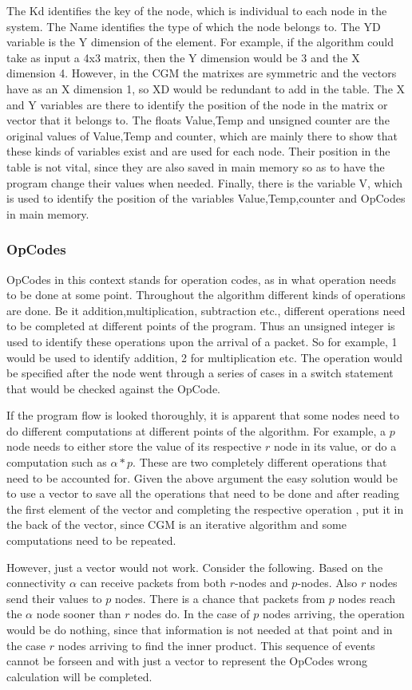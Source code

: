 \documentclass[12pt,a4paper]{article}
\begin{document}
The Kd identifies the key of the node, which is individual to each node in the system. The Name identifies the type of which the node belongs to. The YD variable is the Y dimension of the element. For example, if the algorithm could take as input a 4x3 matrix, then the Y dimension would be 3 and the X dimension 4. However, in the CGM the matrixes are symmetric and the vectors have as an X dimension 1, so XD would be redundant to add in the table. The X and Y variables are there to identify the position of the node in the matrix or vector that it belongs to. The floats Value,Temp and unsigned counter are the original values of Value,Temp and counter, which are mainly there to show that these kinds of variables exist and are used for each node. Their position in the table is not vital, since they are also saved in main memory so as to have the program change their values when needed. Finally, there is the variable V, which is used to identify the position of the variables Value,Temp,counter and OpCodes in main memory.
\subsubsection{OpCodes}
OpCodes in this context stands for operation codes, as in what operation needs to be done at some point. Throughout the algorithm different kinds of operations are done. Be it addition,multiplication, subtraction etc., different operations need to be completed at different points of the program. Thus an unsigned integer is used to identify these operations upon the arrival of a packet. So for example, 1 would be used to identify addition, 2 for multiplication etc. The operation would be specified after the node went through a series of cases in a switch statement that would be checked against the OpCode.

If the program flow is looked thoroughly, it is apparent that some nodes need to do different computations at different points of the algorithm. For example, a $p$ node needs to either store the value of its respective $r$ node in its value, or do a computation such as $\alpha *p$. These are two completely different operations that need to be accounted for. Given the above argument the easy solution would be to use a vector to save all the operations that need to be done and after reading the first element of the vector and completing the respective operation , put it in the back of the vector, since CGM is an iterative algorithm and some computations need to be repeated.

However, just a vector would not work. Consider the following. Based on the connectivity $\alpha$ can receive packets from both $r$-nodes and $p$-nodes. Also $r$ nodes send their values to $p$ nodes. There is a chance that packets from $p$ nodes reach the $\alpha$ node sooner than $r$ nodes do. In the case of $p$ nodes arriving, the operation would be do nothing, since that information is not needed at that point and in the case $r$ nodes arriving to find the inner product.  This sequence of events cannot be forseen and with just a vector to represent the OpCodes wrong calculation will be completed.
\end{document}
